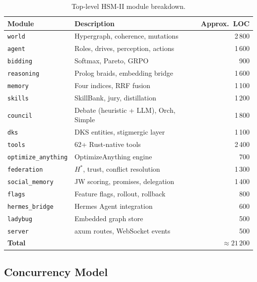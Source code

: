 \documentclass[11pt]{article}
\begin{document}
\begin{table}[H]
\centering
\caption{Top-level HSM-II module breakdown.}
\label{tab:modules}
\small
{}
\begin{tabular}{llr}
\toprule
\textbf{Module} & \textbf{Description} & \textbf{Approx.\ LOC} \\
\midrule
\texttt{world}           & Hypergraph, coherence, mutations   & 2\,800 \\
\texttt{agent}           & Roles, drives, perception, actions & 1\,600 \\
\texttt{bidding}         & Softmax, Pareto, GRPO              & 900 \\
\texttt{reasoning}       & Prolog braids, embedding bridge    & 1\,600 \\
\texttt{memory}          & Four indices, RRF fusion           & 1\,100 \\
\texttt{skills}          & SkillBank, jury, distillation      & 1\,200 \\
\texttt{council}         & Debate (heuristic + LLM), Orch, Simple & 1\,800 \\
\texttt{dks}             & DKS entities, stigmergic layer     & 1\,100 \\
\texttt{tools}            & 62+ Rust-native tools              & 2\,400 \\
\texttt{optimize\_anything} & OptimizeAnything engine         & 700 \\
\texttt{federation}      & $H^*$, trust, conflict resolution  & 1\,300 \\
\texttt{social\_memory}   & JW scoring, promises, delegation   & 1\,400 \\
\texttt{flags}           & Feature flags, rollout, rollback   & 800 \\
\texttt{hermes\_bridge}   & Hermes Agent integration           & 600 \\
\texttt{ladybug}         & Embedded graph store               & 500 \\
\texttt{server}          & axum routes, WebSocket events      & 500 \\
\midrule
\textbf{Total}           &                                    & $\approx\!21\,200$ \\
\bottomrule
\end{tabular}
\end{table}

\subsection{Concurrency Model}
\end{document}
